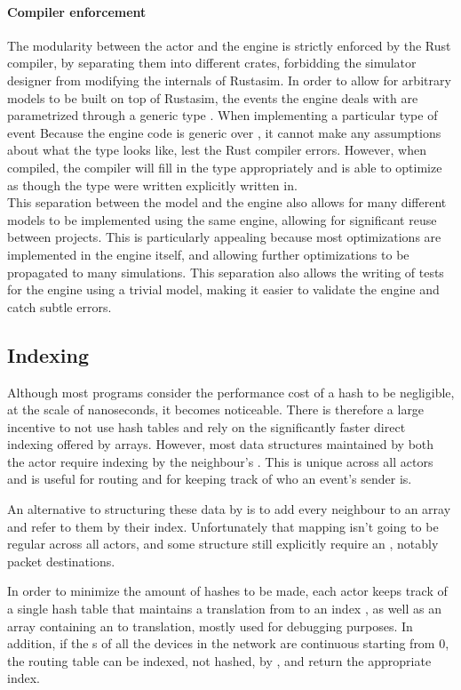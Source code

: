 \paragraph{Compiler enforcement}
The modularity between the actor and the engine is strictly enforced by the Rust compiler, by separating them into different crates, forbidding the simulator designer from modifying the internals of Rustasim.
In order to allow for arbitrary models to be built on top of Rustasim, the events the engine deals with are parametrized through a generic type .
When implementing a particular type of event
Because the engine code is generic over , it cannot make any assumptions about what the type looks like, lest the Rust compiler errors.
However, when compiled, the compiler will fill in the type appropriately and is able to optimize as though the type were written explicitly written in.\\
This separation between the model and the engine also allows for many different models to be implemented using the same engine, allowing for significant reuse between projects.
This is particularly appealing because most optimizations are implemented in the engine itself, and allowing further optimizations to be propagated to many simulations.
This separation also allows the writing of tests for the engine using a trivial model, making it easier to validate the engine and catch subtle errors.

\subsection{Indexing} \label{rustasim-indexing}

Although most programs consider the performance cost of a hash to be negligible, at the scale of nanoseconds, it becomes noticeable.
There is therefore a large incentive to not use hash tables and rely on the significantly faster direct indexing offered by arrays.
However, most data structures maintained by both the actor require indexing by the neighbour's .
This  is unique across all actors and is useful for routing and for keeping track of who an event's sender is.

An alternative to structuring these data by  is to add every neighbour to an array and refer to them by their index.
Unfortunately that mapping isn't going to be regular across all actors, and some structure still explicitly require an , notably packet destinations.

In order to minimize the amount of hashes to be made, each actor keeps track of a single hash table that maintains a translation from  to an index , as well as an array containing an  to  translation, mostly used for debugging purposes.
In addition, if the s of all the devices in the network are continuous starting from 0, the routing table can be indexed, not hashed, by , and return the appropriate index.

